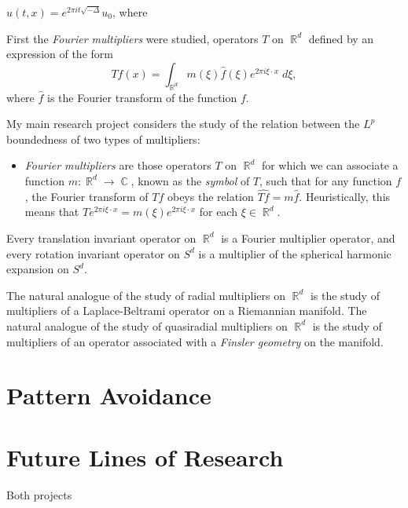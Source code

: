 \documentclass[12pt]{article}
\DeclareMathOperator{\RR}{\mathbb{R}}
\DeclareMathOperator{\CC}{\mathbb{C}}
\begin{document}
$u(t,x) = e^{2 \pi i t \sqrt{-\Delta}} u_0$, where

First the \emph{Fourier multipliers} were studied, operators $T$ on $\RR^d$ defined by an expression of the form
%
\[ Tf(x) = \int_{\RR^d} m(\xi) \widehat{f}(\xi) e^{2 \pi i \xi \cdot x}\; d\xi, \]
%
where $\widehat{f}$ is the Fourier transform of the function $f$.

My main research project considers the study of the relation between the $L^p$ boundedness of two types of multipliers:
%
\begin{itemize}
	\item \emph{Fourier multipliers} are those operators $T$ on $\RR^d$ for which we can associate a function $m: \RR^d \to \CC$, known as the \emph{symbol} of $T$, such that for any function $f$, the Fourier transform of $Tf$ obeys the relation $\widehat{Tf} = m \widehat{f}$. Heuristically, this means that $T e^{2 \pi i \xi \cdot x} = m(\xi) e^{2 \pi i \xi \cdot x}$ for each $\xi \in \RR^d$.
\end{itemize}

  Every translation invariant operator on $\RR^d$ is a Fourier multiplier operator, and every rotation invariant operator on $S^d$ is a multiplier of the spherical harmonic expansion on $S^d$.



The natural analogue of the study of radial multipliers on $\RR^d$ is the study of multipliers of a Laplace-Beltrami operator on a Riemannian manifold. The natural analogue of the study of quasiradial multipliers on $\RR^d$ is the study of multipliers of an operator associated with a \emph{Finsler geometry} on the manifold.

\section*{Pattern Avoidance}

\section*{Future Lines of Research}



Both projects 
\end{document}
